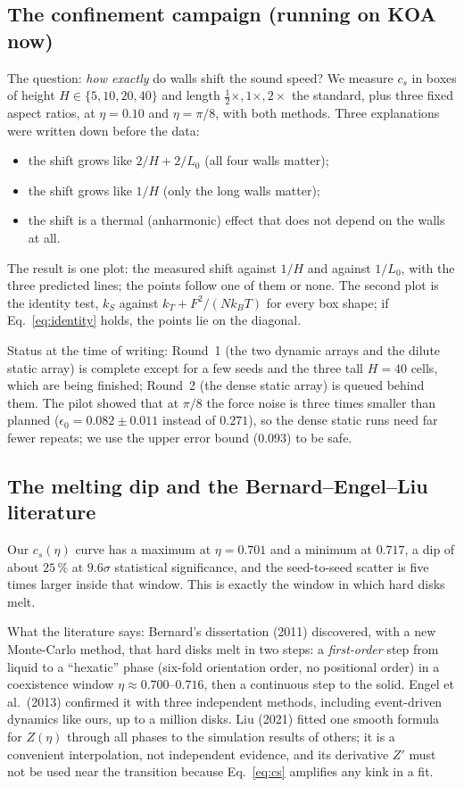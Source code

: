 \documentclass[11pt]{article}
\begin{document}
\subsection{The confinement campaign (running on KOA now)}
The question: \emph{how exactly} do walls shift the sound speed? We measure $c_s$ in boxes of height $H \in \{5,10,20,40\}$ and length $\tfrac12\times, 1\times, 2\times$ the standard, plus three fixed aspect ratios, at $\eta = 0.10$ and $\eta = \pi/8$, with both methods. Three explanations were written down before the data:
\begin{itemize}[nosep]
\item[A] the shift grows like $2/H + 2/L_0$ (all four walls matter);
\item[B] the shift grows like $1/H$ (only the long walls matter);
\item[C] the shift is a thermal (anharmonic) effect that does not depend on the walls at all.
\end{itemize}
The result is one plot: the measured shift against $1/H$ and against $1/L_0$, with the three predicted lines; the points follow one of them or none. The second plot is the identity test, $k_S$ against $k_T + F^2/(N k_B T)$ for every box shape; if Eq.~\eqref{eq:identity} holds, the points lie on the diagonal.

Status at the time of writing: Round~1 (the two dynamic arrays and the dilute static array) is complete except for a few seeds and the three tall $H=40$ cells, which are being finished; Round~2 (the dense static array) is queued behind them. The pilot showed that at $\pi/8$ the force noise is three times smaller than planned ($\epsilon_0 = 0.082 \pm 0.011$ instead of $0.271$), so the dense static runs need far fewer repeats; we use the upper error bound ($0.093$) to be safe.

\subsection{The melting dip and the Bernard--Engel--Liu literature}
Our $c_s(\eta)$ curve has a maximum at $\eta = 0.701$ and a minimum at $0.717$, a dip of about $25\,\%$ at $9.6\sigma$ statistical significance, and the seed-to-seed scatter is five times larger inside that window. This is exactly the window in which hard disks melt.

What the literature says: Bernard's dissertation (2011) discovered, with a new Monte-Carlo method, that hard disks melt in two steps: a \emph{first-order} step from liquid to a ``hexatic'' phase (six-fold orientation order, no positional order) in a coexistence window $\eta \approx 0.700$--$0.716$, then a continuous step to the solid. Engel et al.\ (2013) confirmed it with three independent methods, including event-driven dynamics like ours, up to a million disks. Liu (2021) fitted one smooth formula for $Z(\eta)$ through all phases to the simulation results of others; it is a convenient interpolation, not independent evidence, and its derivative $Z'$ must not be used near the transition because Eq.~\eqref{eq:cs} amplifies any kink in a fit.
\end{document}
